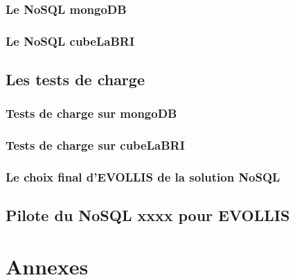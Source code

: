 \documentclass[12pt]{report}
\begin{document}
\section{Le \textsf{NoSQL mongoDB}}

\section{Le \textsf{NoSQL} \textsf{cubeLaBRI}}


\chapter{Les tests de charge}
\section{Tests de charge sur \textsf{mongoDB}}
\section{Tests de charge sur \textsf{cubeLaBRI}}
\section{Le choix final d'\textsf{EVOLLIS} de la solution \textsf{NoSQL}}

\chapter{Pilote du \textsf{NoSQL} xxxx pour \sf  EVOLLIS}

%

\nocite{NoSQLCmp}

%


\part{Annexes}
\appendix

\end{document}
